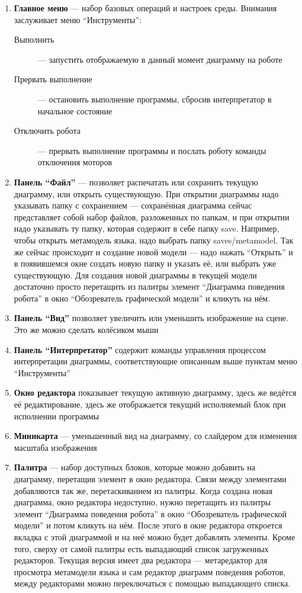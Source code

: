 \documentclass[a4paper,12pt,twoside]{article}
\begin{document}
\pagebreak

\begin{enumerate}
	\item \textbf{Главное меню} --- набор базовых операций и настроек среды. Внимания заслуживает меню "`Инструменты"': 
    \begin{description}
      \item[Выполнить] --- запустить отображаемую в данный момент диаграмму на роботе
      \item[Прервать выполнение] --- остановить выполнение программы, сбросив интерпретатор в начальное состояние
      \item[Отключить робота] --- прервать выполнение программы и послать роботу команды отключения моторов
    \end{description}
  \item \textbf{Панель "`Файл"'} --- позволяет распечатать или сохранить текущую диаграмму, или открыть существующую. При открытии диаграммы надо указывать папку с сохранением --- сохранённая диаграмма сейчас представляет собой набор файлов, разложенных по папкам, и при открытии надо указывать ту папку, которая содержит в себе папку save. Например, чтобы открыть метамодель языка, надо выбрать папку saves/metamodel. Так же сейчас происходит и создание новой модели --- надо нажать "`Открыть"' и в появившемся окне создать новую папку и указать её, или выбрать уже существующую. Для создания новой диаграммы в текущей модели достаточно просто перетащить из палитры элемент "`Диаграмма поведения робота"' в окно "`Обозреватель графической модели"' и кликуть на нём.
  \item \textbf{Панель "`Вид"'} позволяет увеличить или уменьшить изображение на сцене. Это же можно сделать колёсиком мыши
  \item \textbf{Панель "`Интерпретатор"'} содержит команды управления процессом интерпретации диаграммы, соответствующие описанным выше пунктам меню "`Инструменты"'
  \item \textbf{Окно редактора} показывает текущую активную диаграмму, здесь же ведётся её редактирование, здесь же отображается текущий исполняемый блок при исполнении программы
  \item \textbf{Миникарта} --- уменьшенный вид на диаграмму, со слайдером для изменения масштаба изображения
  \item \textbf{Палитра} --- набор доступных блоков, которые можно добавить на диаграмму, перетащив элемент в окно редактора. Связи между элементами добавляются так же, перетаскиванием из палитры. Когда создана новая диаграмма, окно редактора недоступно, нужно перетащить из палитры элемент "`Диаграмма поведения робота"' в окно "`Обозреватель графической модели"' и потом кликуть на нём. После этого в окне редактора откроется вкладка с этой диаграммой и на неё можно будет добавлять элементы. Кроме того, сверху от самой палитры есть выпадающий список загруженных редакторов. Текущая версия имеет два редактора --- метаредактор для просмотра метамодели языка и сам редактор диаграмм поведения роботов, между редакторами можно переключаться с помощью выпадающего списка.

\end{enumerate}
\end{document}
